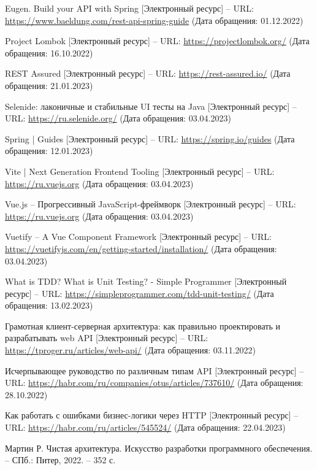 \documentclass[a4paper,article]{article}
\begin{document}
\begin{sloppypar}
\begin{enumerate}[leftmargin=*, itemindent=\labelwidth]
         Eugen. Build your API with Spring [Электронный ресурс] -- URL: \url{https://www.baeldung.com/rest-api-spring-guide} (Дата обращения: 01.12.2022)
        
         Project Lombok [Электронный ресурс] -- URL: \url{https://projectlombok.org/} (Дата обращения: 16.10.2022)
        
         REST Assured [Электронный ресурс] -- URL: \url{https://rest-assured.io/} (Дата обращения: 21.01.2023)
        
         Selenide: лаконичные и стабильные UI тесты на Java [Электронный ресурс] -- URL: \url{https://ru.selenide.org/} (Дата обращения: 03.04.2023)
        
         Spring | Guides [Электронный ресурс] -- URL: \url{https://spring.io/guides} (Дата обращения: 12.01.2023)
        
         Vite | Next Generation Frontend Tooling [Электронный ресурс] -- URL: \url{https://ru.vuejs.org} (Дата обращения: 03.04.2023)
        
         Vue.js -- Прогрессивный JavaScript-фреймворк [Электронный ресурс] -- URL: \url{https://ru.vuejs.org} (Дата обращения: 03.04.2023)
        
         Vuetify -- A Vue Component Framework [Электронный ресурс] -- URL: \url{https://vuetifyjs.com/en/getting-started/installation/} (Дата обращения: 03.04.2023)
        
         What is TDD? What is Unit Testing? - Simple Programmer [Электронный ресурс] -- URL: \url{https://simpleprogrammer.com/tdd-unit-testing/} (Дата обращения: 13.02.2023)
        
         Грамотная клиент-серверная архитектура: как правильно проектировать и разрабатывать web API [Электронный ресурс] -- URL: \url{https://tproger.ru/articles/web-api/} (Дата обращения: 03.11.2022)
        
         Исчерпывающее руководство по различным типам API [Электронный ресурс] -- URL: \url{https://habr.com/ru/companies/otus/articles/737610/} (Дата обращения: 28.10.2022)
        
         Как работать с ошибками бизнес-логики через HTTP [Электронный ресурс] -- URL: \url{https://habr.com/ru/articles/545524/} (Дата обращения: 22.04.2023)
        
         Мартин Р. Чистая архитектура. Искусство разработки программного обеспечения. -- СПб.: Питер, 2022. -- 352 с.
        

\end{enumerate}
\end{sloppypar}
\end{document}
